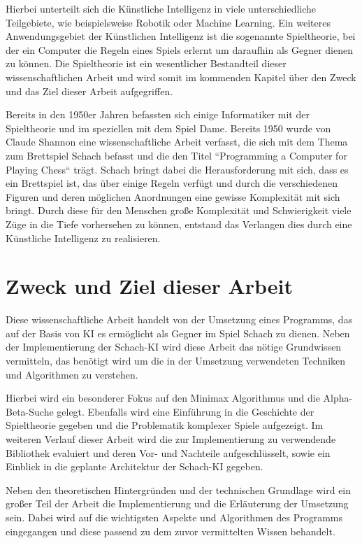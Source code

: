Hierbei unterteilt sich die Künstliche Intelligenz in viele unterschiedliche Teilgebiete, wie beispielsweise Robotik oder Machine Learning. Ein weiteres Anwendungsgebiet der Künstlichen Intelligenz ist die sogenannte Spieltheorie, bei der ein Computer die Regeln eines Spiels erlernt um daraufhin als Gegner dienen zu können. Die Spieltheorie ist ein wesentlicher Bestandteil dieser wissenschaftlichen Arbeit und wird somit im kommenden Kapitel über den Zweck und das Ziel dieser Arbeit aufgegriffen.

Bereits in den 1950er Jahren befassten sich einige Informatiker mit der Spieltheorie und im speziellen mit dem Spiel Dame. Bereits 1950 wurde von Claude Shannon eine wissenschaftliche Arbeit verfasst, die sich mit dem Thema zum Brettspiel Schach befasst und die den Titel ``Programming a Computer for Playing Chess`` trägt.\cite{Shannon1950} Schach bringt dabei die Herausforderung mit sich, dass es ein Brettspiel ist, das über einige Regeln verfügt und durch die verschiedenen Figuren und deren möglichen Anordnungen eine gewisse Komplexität mit sich bringt. Durch diese für den Menschen große Komplexität und Schwierigkeit viele Züge in die Tiefe vorhersehen zu können, entstand das Verlangen dies durch eine Künstliche Intelligenz zu realisieren.


\section{Zweck und Ziel dieser Arbeit}\label{zweck_und_ziel}
Diese wissenschaftliche Arbeit handelt von der Umsetzung eines Programms, das auf der Basis von KI es ermöglicht als Gegner im Spiel Schach zu dienen. Neben der Implementierung der Schach-KI wird diese Arbeit das nötige Grundwissen vermitteln, das benötigt wird um die in der Umsetzung verwendeten Techniken und Algorithmen zu verstehen. 

Hierbei wird ein besonderer Fokus auf den Minimax Algorithmus und die Alpha-Beta-Suche gelegt. Ebenfalls wird eine Einführung in die Geschichte der Spieltheorie gegeben und die Problematik komplexer Spiele aufgezeigt. Im weiteren Verlauf dieser Arbeit wird die zur Implementierung zu verwendende Bibliothek evaluiert und deren Vor- und Nachteile aufgeschlüsselt, sowie ein Einblick in die geplante Architektur der Schach-KI gegeben.

Neben den theoretischen Hintergründen und der technischen Grundlage wird ein großer Teil der Arbeit die Implementierung und die Erläuterung der Umsetzung sein. Dabei wird auf die wichtigsten Aspekte und Algorithmen des Programms eingegangen und diese passend zu dem zuvor vermittelten Wissen behandelt. 

